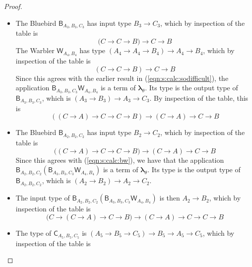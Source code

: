 \documentclass{lmcs} %
\newcommand{\param}{\theta}
\newcommand{\mltup}{\boldsymbol\lambda_{\param}}
\newcommand{\ctC}[6]{{\mathsf C}_{#1, #2, #3}#4#5#6}
\newcommand{\ctW}[4]{{\mathsf W}_{#1, #2}#3#4}
\newcommand{\ctB}[6]{{\mathsf B}_{#1, #2, #3}#4#5#6}
\begin{document}
\begin{proof}
\begin{proofdetail}
\begin{itemize}[leftmargin=*]
\item The Bluebird $\ctB{A_3}{B_3}{C_3}{}{}{}$ has input type $B_3\rightarrow C_3$, which by inspection of the table is 
\begin{equation}\label{eqn:s:calc:sodifficult}
\big(C\rightarrow C\rightarrow B\big)\rightarrow C\rightarrow B
\end{equation}
The Warbler $\ctW{A_4}{B_4}{}{}$ has type $(A_4\rightarrow A_4\rightarrow B_4)\rightarrow A_4\rightarrow B_4$, which by inspection of the table is 
\begin{equation*}
(C\rightarrow C\rightarrow B)\rightarrow C\rightarrow B
\end{equation*}
Since this agrees with the earlier result in (\ref{eqn:s:calc:sodifficult}), the application $\ctB{A_3}{B_3}{C_3}{}{}{} \ctW{A_4}{B_4}{}{}$ is a term of $\mltup$. Its type is the output type of $\ctB{A_3}{B_3}{C_3}{}{}{}$, which is $(A_3\rightarrow B_3)\rightarrow A_3\rightarrow C_3$. By inspection of the table, this is
\begin{equation}\label{eqn:s:calc:bw}
((C\rightarrow A)\rightarrow C\rightarrow C\rightarrow B)\rightarrow (C\rightarrow A)\rightarrow C\rightarrow B
\end{equation}
\item The Bluebird $\ctB{A_2}{B_2}{C_2}{}{}{}$ has input type $B_2\rightarrow C_2$, which by inspection of the table is 
\begin{equation*}
\big((C\rightarrow A)\rightarrow C\rightarrow C\rightarrow B \big)\rightarrow (C\rightarrow A)\rightarrow C\rightarrow B
\end{equation*}
Since this agrees with (\ref{eqn:s:calc:bw}), we have that the application $\ctB{A_2}{B_2}{C_2}{}{}{} (\ctB{A_3}{B_3}{C_3}{}{}{} \ctW{A_4}{B_4}{}{})$ is a term of $\mltup$. Its type is the output type of $\ctB{A_2}{B_2}{C_2}{}{}{}$, which is $(A_2\rightarrow B_2)\rightarrow A_2\rightarrow C_2$.
\item The input type of $\ctB{A_2}{B_2}{C_2}{}{}{} (\ctB{A_3}{B_3}{C_3}{}{}{} \ctW{A_4}{B_4}{}{})$ is then $A_2\rightarrow B_2$, which by inspection of the table is
\begin{equation}\label{eqn:s:inputb(bw)}
\big( C\rightarrow (C\rightarrow A)\rightarrow C\rightarrow B\big) \rightarrow (C\rightarrow A)\rightarrow C\rightarrow C\rightarrow B
\end{equation}
\item The type of $\ctC{A_5}{B_5}{C_5}{}{}{}$ is $(A_5\rightarrow B_5\rightarrow C_5)\rightarrow B_5\rightarrow A_5\rightarrow C_5$, which by inspection of the table is

\end{itemize}
\end{proofdetail}
\end{proof}
\end{document}
